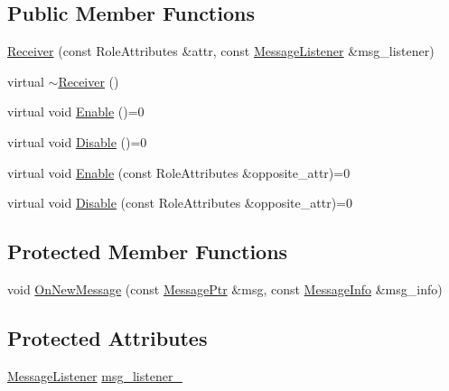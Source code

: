 \subsection*{Public Member Functions}
\begin{DoxyCompactItemize}
\item 
\hyperlink{classapollo_1_1cyber_1_1transport_1_1Receiver_a5c95fdfe9d06a15f5474541a1b9ea2f5}{Receiver} (const Role\-Attributes \&attr, const \hyperlink{classapollo_1_1cyber_1_1transport_1_1Receiver_abd906fd03582b49acbdc81b48a8974aa}{Message\-Listener} \&msg\-\_\-listener)
\item 
virtual \hyperlink{classapollo_1_1cyber_1_1transport_1_1Receiver_a9a21bfe1f325ad8af46c9eb702f4429b}{$\sim$\-Receiver} ()
\item 
virtual void \hyperlink{classapollo_1_1cyber_1_1transport_1_1Receiver_a77c93406c2ab9254562d595bfaecabbc}{Enable} ()=0
\item 
virtual void \hyperlink{classapollo_1_1cyber_1_1transport_1_1Receiver_af9f317df425a33bc364662a59be28bf5}{Disable} ()=0
\item 
virtual void \hyperlink{classapollo_1_1cyber_1_1transport_1_1Receiver_a2436ecca6981d910911d359cd1df4610}{Enable} (const Role\-Attributes \&opposite\-\_\-attr)=0
\item 
virtual void \hyperlink{classapollo_1_1cyber_1_1transport_1_1Receiver_a26a4b466924d472f830f856b675bb44a}{Disable} (const Role\-Attributes \&opposite\-\_\-attr)=0
\end{DoxyCompactItemize}
\subsection*{Protected Member Functions}
\begin{DoxyCompactItemize}
\item 
void \hyperlink{classapollo_1_1cyber_1_1transport_1_1Receiver_ab6db34cf266f899c426ed37d8410ecc2}{On\-New\-Message} (const \hyperlink{classapollo_1_1cyber_1_1transport_1_1Receiver_af02a7bde2d210b5e2e122ba3810933d1}{Message\-Ptr} \&msg, const \hyperlink{classapollo_1_1cyber_1_1transport_1_1MessageInfo}{Message\-Info} \&msg\-\_\-info)
\end{DoxyCompactItemize}
\subsection*{Protected Attributes}
\begin{DoxyCompactItemize}
\item 
\hyperlink{classapollo_1_1cyber_1_1transport_1_1Receiver_abd906fd03582b49acbdc81b48a8974aa}{Message\-Listener} \hyperlink{classapollo_1_1cyber_1_1transport_1_1Receiver_a89ce9185e2eabed8eb189d7917fdb746}{msg\-\_\-listener\-\_\-}
\end{DoxyCompactItemize}


